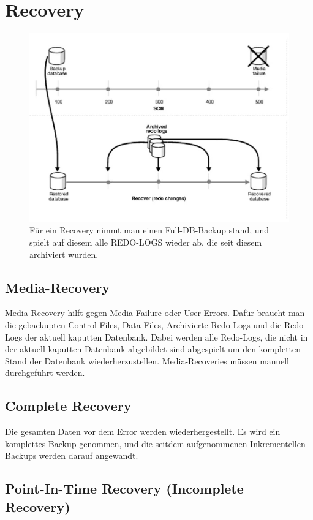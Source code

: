 \section{Recovery}

\begin{figure}[H]
    \centering
    \includegraphics[width=.65\textwidth]{Content/images/backup/recovery.png}
    \caption{Für ein Recovery nimmt man einen Full-DB-Backup stand, und spielt auf diesem alle REDO-LOGS wieder ab, die seit diesem archiviert wurden.}
    \label{fig:backup:recovery}
\end{figure}

\subsection{Media-Recovery}

Media Recovery hilft gegen Media-Failure oder User-Errors. Dafür braucht man die gebackupten Control-Files, Data-Files, Archivierte Redo-Logs und die Redo-Logs der aktuell kaputten Datenbank. Dabei werden alle Redo-Logs, die nicht in der aktuell kaputten
Datenbank abgebildet sind abgespielt um den kompletten Stand der Datenbank wiederherzustellen. Media-Recoveries müssen manuell durchgeführt werden.

\subsection{Complete Recovery}

Die gesamten Daten vor dem Error werden wiederhergestellt. Es wird ein komplettes Backup genommen, und die seitdem aufgenommenen Inkrementellen-Backups werden darauf angewandt.

\subsection{Point-In-Time Recovery (Incomplete Recovery)}

